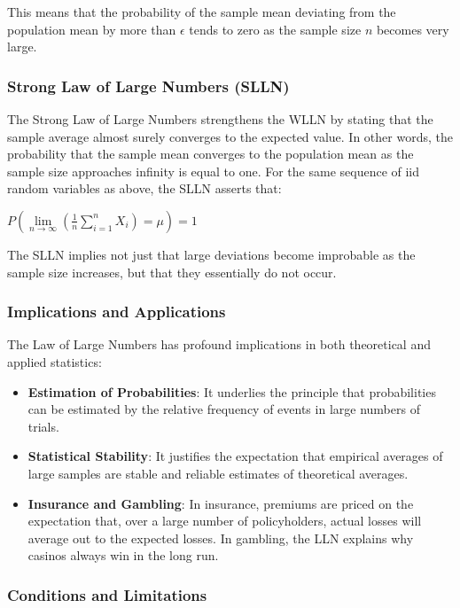 \documentclass{article}
\begin{document}
This means that the probability of the sample mean deviating from the population mean by more than $\epsilon$ tends to zero as the sample size $n$ becomes very large.

\subsubsection{Strong Law of Large Numbers (SLLN)}

The Strong Law of Large Numbers strengthens the WLLN by stating that the sample average almost surely converges to the expected value. In other words, the probability that the sample mean converges to the population mean as the sample size approaches infinity is equal to one. For the same sequence of iid random variables as above, the SLLN asserts that:

$P(\lim\limits_{n\rightarrow \infty} (\frac {1} {n} \sum_{i=1}^{n} X_i)=\mu) =1$

The SLLN implies not just that large deviations become improbable as the sample size increases, but that they essentially do not occur.

\subsubsection{Implications and Applications}

The Law of Large Numbers has profound implications in both theoretical and applied statistics:

\begin{itemize}
    \item \textbf{Estimation of Probabilities}: It underlies the principle that probabilities can be estimated by the relative frequency of events in large numbers of trials.
    \item \textbf{Statistical Stability}: It justifies the expectation that empirical averages of large samples are stable and reliable estimates of theoretical averages.
    \item \textbf{Insurance and Gambling}: In insurance, premiums are priced on the expectation that, over a large number of policyholders, actual losses will average out to the expected losses. In gambling, the LLN explains why casinos always win in the long run.
\end{itemize}

\subsubsection{Conditions and Limitations}
\end{document}
